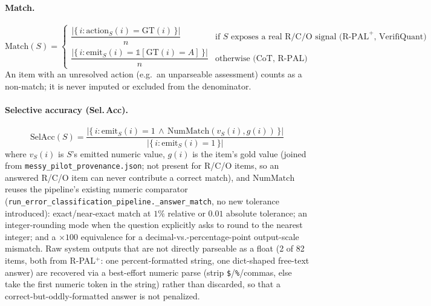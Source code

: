 \documentclass[11pt]{article}
\begin{document}
\paragraph{Match.}
\[
\mathrm{Match}(S) =
\begin{cases}
\dfrac{\left|\{\, i : \mathrm{action}_S(i) = \mathrm{GT}(i) \,\}\right|}{n} & \text{if } S \text{ exposes a real R/C/O signal (R-PAL}^{+}\text{, VerifiQuant)} \\[1.2em]
\dfrac{\left|\{\, i : \mathrm{emit}_S(i) = \mathbb{1}[\mathrm{GT}(i){=}A] \,\}\right|}{n} & \text{otherwise (CoT, R-PAL)}
\end{cases}
\]
An item with an unresolved action (e.g.\ an unparseable assessment) counts as a non-match; it is
never imputed or excluded from the denominator.

\paragraph{Selective accuracy (Sel.\,Acc).}
\[
\mathrm{SelAcc}(S) = \frac{\left|\{\, i : \mathrm{emit}_S(i){=}1 \,\wedge\, \mathrm{NumMatch}(v_S(i), g(i)) \,\}\right|}{\left|\{\, i : \mathrm{emit}_S(i){=}1 \,\}\right|}
\]
where $v_S(i)$ is $S$'s emitted numeric value, $g(i)$ is the item's gold value (joined from
\texttt{messy\_pilot\_provenance.json}; not present for R/C/O items, so an answered R/C/O item
can never contribute a correct match), and $\mathrm{NumMatch}$ reuses the pipeline's existing
numeric comparator (\texttt{run\_error\_classification\_pipeline.\_answer\_match}, no new
tolerance introduced): exact/near-exact match at $1\%$ relative or $0.01$ absolute tolerance; an
integer-rounding mode when the question explicitly asks to round to the nearest integer; and a
$\times100$ equivalence for a decimal-vs.-percentage-point output-scale mismatch. Raw system
outputs that are not directly parseable as a float (2 of 82 items, both from R-PAL$^{+}$: one
percent-formatted string, one dict-shaped free-text answer) are recovered via a best-effort
numeric parse (strip \texttt{\$}/\texttt{\%}/commas, else take the first numeric token in the
string) rather than discarded, so that a correct-but-oddly-formatted answer is not penalized.
\end{document}
